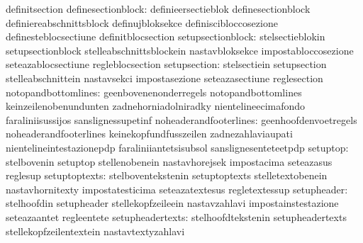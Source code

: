                                   definitsection
              definesectionblock: definieersectieblok              definesectionblock
                                  definiereabschnittsblock         definujbloksekce
                                  definiscibloccosezione           definesteblocsectiune
                                  definitblocsection
               setupsectionblock: stelsectieblokin                 setupsectionblock
                                  stelleabschnittsblockein         nastavbloksekce
                                  impostabloccosezione             seteazablocsectiune
                                  regleblocsection
                    setupsection: stelsectiein                     setupsection
                                  stelleabschnittein               nastavsekci
                                  impostasezione                   seteazasectiune
                                  reglesection
             notopandbottomlines: geenbovenenonderregels           notopandbottomlines
                                  keinzeilenobenundunten           zadnehorniadolniradky
                                  nientelineecimafondo             faraliniisussijos
                                  sanslignessupetinf
          noheaderandfooterlines: geenhoofdenvoetregels            noheaderandfooterlines
                                  keinekopfundfusszeilen           zadnezahlaviaupati
                                  nientelineintestazionepdp        faraliniiantetsisubsol
                                  sanslignesenteteetpdp
                        setuptop: stelbovenin                      setuptop
                                  stellenobenein                   nastavhorejsek
                                  impostacima                      seteazasus
                                  reglesup
                   setuptoptexts: stelboventekstenin               setuptoptexts
                                  stelletextobenein                nastavhornitexty
                                  impostatesticima                 seteazatextesus
                                  regletextessup
                     setupheader: stelhoofdin                      setupheader
                                  stellekopfzeileein               nastavzahlavi
                                  impostainstestazione             seteazaantet
                                  regleentete
                setupheadertexts: stelhoofdtekstenin               setupheadertexts
                                  stellekopfzeilentextein          nastavtextyzahlavi
